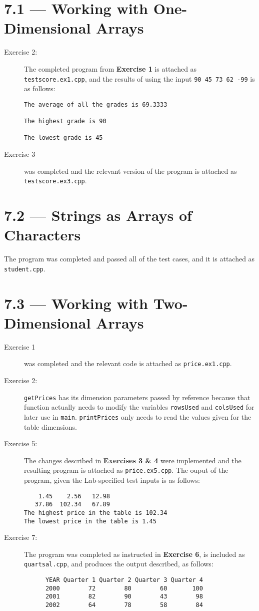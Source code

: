 \documentclass[11pt]{article}
\begin{document}
\section*{7.1 --- Working with One-Dimensional Arrays}
\begin{description}
    \item[Exercise 2:] The completed program from \textbf{Exercise 1} is attached as \texttt{testscore.ex1.cpp}, and the results of using the input \texttt{90 45 73 62 -99} is as follows: \begin{verbatim}
The average of all the grades is 69.3333

The highest grade is 90

The lowest grade is 45
    \end{verbatim}
    \item[Exercise 3] was completed and the relevant version of the program is attached as \texttt{testscore.ex3.cpp}.
\end{description}

\section*{7.2 --- Strings as Arrays of Characters}
    The program was completed and passed all of the test cases, and it is attached as \texttt{student.cpp}.

\section*{7.3 --- Working with Two-Dimensional Arrays}
\begin{description}
    \item[Exercise 1] was completed and the relevant code is attached as \texttt{price.ex1.cpp}.
    \item[Exercise 2:] \lstinline{getPrices} has its dimension parameters passed by reference because that function actually needs to modify the variables \lstinline{rowsUsed} and \lstinline{colsUsed} for later use in \lstinline{main}. \lstinline{printPrices} only needs to read the values given for the table dimensions.
    \item[Exercise 5:] The changes described in \textbf{Exercises 3 \& 4} were implemented and the resulting program is attached as \texttt{price.ex5.cpp}. The ouput of the program, given the Lab-specified test inputs is as follows: \begin{verbatim}
    1.45    2.56   12.98
   37.86  102.34   67.89
The highest price in the table is 102.34
The lowest price in the table is 1.45
\end{verbatim}
    \item[Exercise 7:] The program was completed as instructed in \textbf{Exercise 6}, is included as \texttt{quartsal.cpp}, and produces the output described, as follows: \begin{verbatim}
      YEAR Quarter 1 Quarter 2 Quarter 3 Quarter 4
      2000        72        80        60       100
      2001        82        90        43        98
      2002        64        78        58        84
\end{verbatim}
\end{description}
\end{document}
